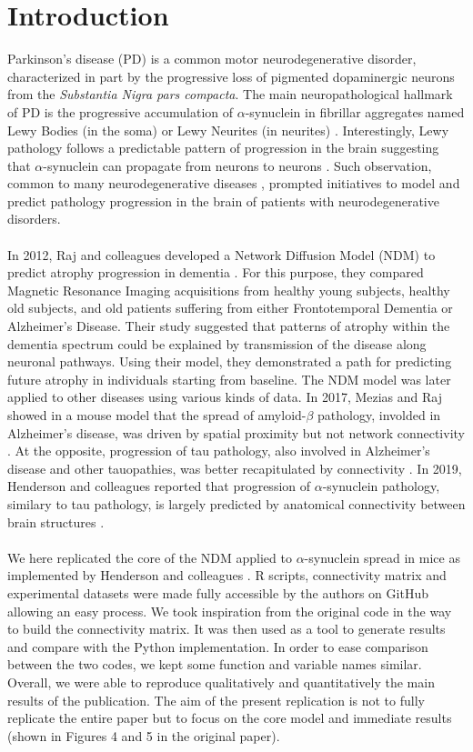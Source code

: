 \section{Introduction}

Parkinson's disease (PD) is a common motor neurodegenerative disorder, characterized in part by the progressive loss of pigmented dopaminergic neurons from the \textit{Substantia Nigra pars compacta}. The main neuropathological hallmark of PD is the progressive accumulation of $\alpha$-synuclein in fibrillar aggregates named Lewy Bodies (in the soma) or Lewy Neurites (in neurites) \cite{Dehay_2015}. Interestingly, Lewy pathology follows a predictable pattern of progression in the brain suggesting that $\alpha$-synuclein can propagate from neurons to neurons \cite{Braak_2003}. Such observation, common to many neurodegenerative diseases \cite{Jucker_2018}, prompted initiatives to model and predict pathology progression in the brain of patients with neurodegenerative disorders.\\
\\
In 2012, Raj and colleagues developed a Network Diffusion Model (NDM) to predict atrophy progression in dementia \cite{Raj_2012}. For this purpose, they compared Magnetic Resonance Imaging acquisitions from healthy young subjects, healthy old subjects, and old patients suffering from either Frontotemporal Dementia or Alzheimer's Disease. Their study suggested that patterns of atrophy within the dementia spectrum could be explained by transmission of the disease along neuronal pathways. Using their model, they demonstrated a path for predicting future atrophy in individuals starting from baseline. The NDM model was later applied to other diseases using various kinds of data. In 2017, Mezias and Raj showed in a mouse model that the spread of amyloid-$\beta$ pathology, involded in Alzheimer's disease, was driven by spatial proximity but not network connectivity \cite{Mezias_2017_abeta}. At the opposite, progression of tau pathology, also involved in Alzheimer's disease and other tauopathies, was better recapitulated by connectivity \cite{Mezias_2017_tau}. In 2019, Henderson and colleagues reported that progression of $\alpha$-synuclein pathology, similary to tau pathology, is largely predicted by anatomical connectivity between brain structures \cite{Henderson_2019}.\\
\\
We here replicated the  core of the NDM applied to $\alpha$-synuclein spread in mice as implemented by Henderson and colleagues \cite{Henderson_2019}. R scripts, connectivity matrix and experimental datasets were made fully accessible by the authors on GitHub allowing an easy process. We took inspiration from the original code in the way to build the connectivity matrix. It was then used as a tool to generate results and compare with the Python implementation. In order to ease comparison between the two codes, we kept some function and variable names similar. Overall, we were able to reproduce qualitatively and quantitatively the main results of the publication. The aim of the present replication is not to fully replicate the entire paper but to focus on the core model and immediate results (shown in Figures 4 and 5 in the original paper).\\
